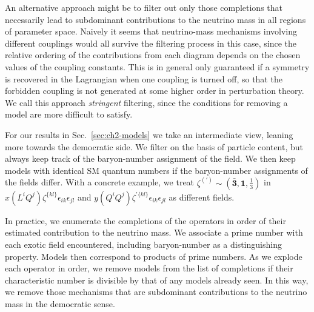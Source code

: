 An alternative approach might be to filter out only those completions that
necessarily lead to subdominant contributions to the neutrino mass in all
regions of parameter space. Naively it seems that neutrino-mass mechanisms
involving different couplings would all survive the filtering process in this
case, since the relative ordering of the contributions from each diagram depends
on the chosen values of the coupling constants. This is in general only
guaranteed if a symmetry is recovered in the Lagrangian when one coupling is
turned off, so that the forbidden coupling is not generated at some higher order
in perturbation theory. We call this approach \textit{stringent} filtering,
since the conditions for removing a model are more difficult to satisfy.

For our results in Sec.~\ref{sec:ch2-models} we take an intermediate view, leaning
more towards the democratic side. We filter on the basis of particle content,
but always keep track of the baryon-number assignment of the field. We then keep
models with identical SM quantum numbers if the baryon-number assignments of the
fields differ. With a concrete example, we treat
$\zeta^{(\prime)} \sim (\bar{\mathbf{3}}, \mathbf{1}, \tfrac{1}{3})$ in
$x (L^{i} Q^{j}) \zeta^{\{kl\}} \epsilon_{ik} \epsilon_{jl}$ and
$y (Q^{i} Q^{j}) \zeta^{\prime \{kl\}} \epsilon_{ik} \epsilon_{jl}$ as different
fields.

In practice, we enumerate the completions of the operators in order of their
estimated contribution to the neutrino mass. We associate a prime number with
each exotic field encountered, including baryon-number as a distinguishing
property. Models then correspond to products of prime numbers. As we explode
each operator in order, we remove models from the list of completions if their
characteristic number is divisible by that of any models already seen. In this
way, we remove those mechanisms that are subdominant contributions to the
neutrino mass in the democratic sense.


